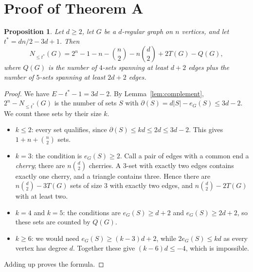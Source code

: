 \documentclass[11pt]{article}
\newtheorem{proposition}[theorem]{Proposition}
\theoremstyle{remark}
\newcommand{\Nle}[1]{N_{\le #1}}
\begin{document}
\section{Proof of Theorem A}\label{sec:A}
\begin{proposition}\label{prop:formula}
Let $d\ge2$, let $G$ be a $d$-regular graph on $n$ vertices, and let
$t^*=dn/2-3d+1$. Then
\[
 \Nle{t^*}(G)=2^n-1-n-\binom n2-n\binom d2+2T(G)-Q(G),
\]
where $Q(G)$ is the number of $4$-sets spanning at least $d+2$ edges plus the
number of $5$-sets spanning at least $2d+2$ edges.
\end{proposition}
\begin{proof}
We have $E-t^*-1=3d-2$. By Lemma~\ref{lem:complement}, $2^n-\Nle{t^*}(G)$ is
the number of sets $S$ with $\partial(S)=d|S|-e_G(S)\le3d-2$. We count these
sets by their size $k$.
\begin{itemize}
\item $k\le2$: every set qualifies, since $\partial(S)\le kd\le2d\le3d-2$.
 This gives $1+n+\binom n2$ sets.
\item $k=3$: the condition is $e_G(S)\ge2$. Call a pair of edges with a
 common end a \emph{cherry}; there are $n\binom d2$ cherries. A $3$-set with
 exactly two edges contains exactly one cherry, and a triangle contains three.
 Hence there are $n\binom d2-3T(G)$ sets of size $3$ with exactly two edges,
 and $n\binom d2-2T(G)$ with at least two.
\item $k=4$ and $k=5$: the conditions are $e_G(S)\ge d+2$ and
 $e_G(S)\ge2d+2$, so these sets are counted by $Q(G)$.
\item $k\ge6$: we would need $e_G(S)\ge(k-3)d+2$, while $2e_G(S)\le kd$ as
 every vertex has degree $d$. Together these give $(k-6)d\le-4$, which is
 impossible.
\end{itemize}
Adding up proves the formula.
\end{proof}
\end{document}
